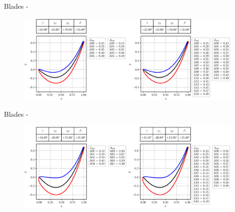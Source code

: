 \begin{frame}{Blades - }
    \begin{figure}
        \hspace*{-0.8cm}
        \includegraphics[width=1.2\textwidth, trim=3cm 0cm 0cm 0cm, clip]{./images/blade1.eps}
    \end{figure}
\end{frame}

\begin{frame}{Blades - }
    \begin{figure}
        \hspace*{-0.8cm}
        \includegraphics[width=1.2\textwidth, trim=3cm 0cm 0cm 0cm, clip]{./images/blade2.eps}
    \end{figure}
\end{frame}


